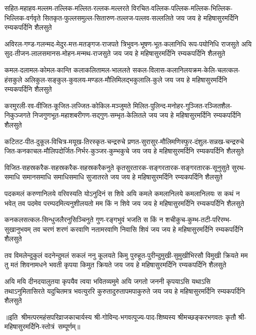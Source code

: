 \fourlineindentedshloka
{सहित-महाहव-मल्लम-तल्लिक-मल्लित-रल्लक-मल्लरते}
{विरचित-वल्लिक-पल्लिक-मल्लिक-भिल्लिक-भिल्लिक-वर्गवृते}
{सितकृत-फुल्लसमुल्ल-सितारुण-तल्लज-पल्लव-सल्ललिते}
{जय जय हे महिषासुरमर्दिनि रम्यकपर्दिनि शैलसुते}

\fourlineindentedshloka
{अविरल-गण्ड-गलन्मद-मेदुर-मत्त-मतङ्गज-राजपते}
{त्रिभुवन-भूषण-भूत-कलानिधि रूप-पयोनिधि राजसुते}
{अयि सुद-तीजन-लालसमानस-मोहन-मन्मथ-राजसुते}
{जय जय हे महिषासुरमर्दिनि रम्यकपर्दिनि शैलसुते}

\fourlineindentedshloka
{कमल-दलामल-कोमल-कान्ति कलाकलितामल-भाललते}
{सकल-विलास-कलानिलयक्रम-केलि-चलत्कल-हंसकुले}
{अलिकुल-सङ्कुल-कुवलय-मण्डल-मौलिमिलद्भकुलालि-कुले}
{जय जय हे महिषासुरमर्दिनि रम्यकपर्दिनि शैलसुते}

\fourlineindentedshloka
{करमुरली-रव-वीजित-कूजित-लज्जित-कोकिल-मञ्जुमते}
{मिलित-पुलिन्द-मनोहर-गुञ्जित-रञ्जितशैल-निकुञ्जगते}
{निजगुणभूत-महाशबरीगण-सद्गुण-सम्भृत-केलितले}
{जय जय हे महिषासुरमर्दिनि रम्यकपर्दिनि शैलसुते}

\fourlineindentedshloka
{कटितट-पीत-दुकूल-विचित्र-मयूख-तिरस्कृत-चन्द्ररुचे}
{प्रणत-सुरासुर-मौलिमणिस्फुर-दंशुल-सन्नख-चन्द्ररुचे}
{जित-कनकाचल-मौलिपदोर्जित-निर्भर-कुञ्जर-कुम्भकुचे}
{जय जय हे महिषासुरमर्दिनि रम्यकपर्दिनि शैलसुते}

\fourlineindentedshloka
{विजित-सहस्रकरैक-सहस्रकरैक-सहस्रकरैकनुते}
{कृतसुरतारक-सङ्गरतारक-सङ्गरतारक-सूनुसुते}
{सुरथ-समाधि समानसमाधि समाधिसमाधि सुजातरते}
{जय जय हे महिषासुरमर्दिनि रम्यकपर्दिनि शैलसुते}

\fourlineindentedshloka
{पदकमलं करुणानिलये वरिवस्यति योऽनुदिनं स शिवे}
{अयि कमले कमलानिलये कमलानिलयः स कथं न भवेत्}
{तव पदमेव परम्पदमित्यनुशीलयतो मम किं न शिवे}
{जय जय हे महिषासुरमर्दिनि रम्यकपर्दिनि शैलसुते}

\fourlineindentedshloka
{कनकलसत्कल-सिन्धुजलैरनुसिञ्चिनुते गुण-रङ्गभुवं}
{भजति स किं न शचीकुच-कुम्भ-तटी-परिरम्भ-सुखानुभवम्}
{तव चरणं शरणं करवाणि नतामरवाणि निवासि शिवं}
{जय जय हे महिषासुरमर्दिनि रम्यकपर्दिनि शैलसुते}

\fourlineindentedshloka
{तव विमलेन्दुकुलं वदनेन्दुमलं सकलं ननु कूलयते}
{किमु पुरुहूत-पुरीन्दुमुखी-सुमुखीभिरसौ विमुखी क्रियते}
{मम तु मतं शिवनामधने भवती कृपया किमुत क्रियते}
{जय जय हे महिषासुरमर्दिनि रम्यकपर्दिनि शैलसुते}

\fourlineindentedshloka
{अयि मयि दीनदयालुतया कृपयैव त्वया भवितव्यमुमे}
{अयि जगतो जननी कृपयाऽसि यथाऽसि तथाऽनुमितासिरते}
{यदुचितमत्र भवत्युररि कुरुतादुरुतापमपाकुरुते}
{जय जय हे महिषासुरमर्दिनि रम्यकपर्दिनि शैलसुते}

॥इति~श्रीमत्परमहंसपरिव्राजकाचार्यस्य श्री-गोविन्द-भगवत्पूज्य-पाद-शिष्यस्य
श्रीमच्छङ्करभगवतः कृतौ  श्री-महिषासुरमर्दिनि-स्तोत्रं~सम्पूर्णम्॥
\setlength{\shlokaspaceskip}{24pt}